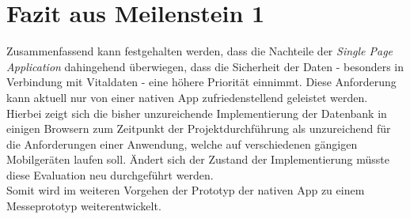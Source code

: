 \section{Fazit aus Meilenstein 1}
\label{sec:gegenueberstellung-fazit}
Zusammenfassend kann festgehalten werden, dass die Nachteile der \textit{Single Page Application} dahingehend überwiegen, dass die Sicherheit der Daten - besonders in Verbindung mit Vitaldaten - eine höhere Priorität einnimmt. Diese Anforderung kann aktuell nur von einer nativen App zufriedenstellend geleistet werden. Hierbei zeigt sich die bisher unzureichende Implementierung der Datenbank in einigen Browsern zum Zeitpunkt der Projektdurchführung als unzureichend für die Anforderungen einer Anwendung, welche auf verschiedenen gängigen Mobilgeräten laufen soll. Ändert sich der Zustand der Implementierung müsste diese Evaluation neu durchgeführt werden. \\
Somit wird im weiteren Vorgehen der Prototyp der nativen App zu einem Messeprototyp weiterentwickelt. 
